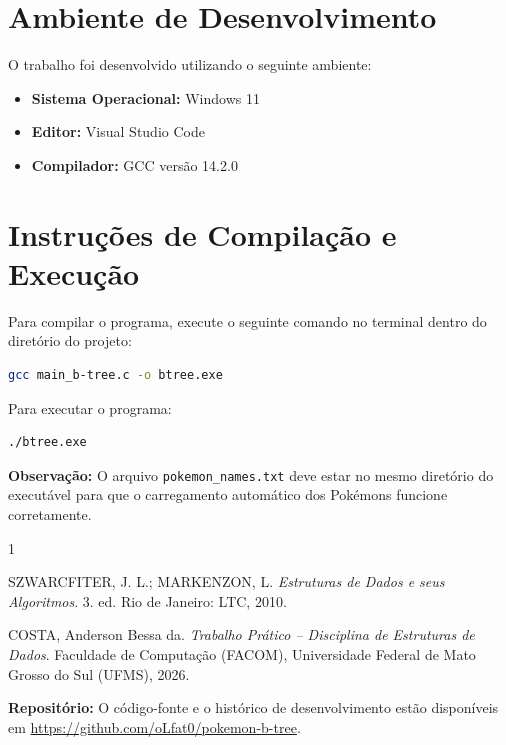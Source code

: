 \documentclass[12pt,a4paper]{article}
\begin{document}
\section{Ambiente de Desenvolvimento}

O trabalho foi desenvolvido utilizando o seguinte ambiente:

\begin{itemize}
    \item \textbf{Sistema Operacional:} Windows 11
    \item \textbf{Editor:} Visual Studio Code
    \item \textbf{Compilador:} GCC versão 14.2.0
\end{itemize}

\section{Instruções de Compilação e Execução}

Para compilar o programa, execute o seguinte comando no terminal dentro do diretório do projeto:

\begin{lstlisting}[language=bash, numbers=none]
gcc main_b-tree.c -o btree.exe
\end{lstlisting}

Para executar o programa:

\begin{lstlisting}[language=bash, numbers=none]
./btree.exe
\end{lstlisting}

\textbf{Observação:} O arquivo \texttt{pokemon\_names.txt} deve estar no mesmo diretório do executável para que o carregamento automático dos Pokémons funcione corretamente.

\begin{thebibliography}{1}

SZWARCFITER, J. L.; MARKENZON, L.
\textit{Estruturas de Dados e seus Algoritmos}.
3. ed. Rio de Janeiro: LTC, 2010.

COSTA, Anderson Bessa da.
\textit{Trabalho Prático -- Disciplina de Estruturas de Dados}.
Faculdade de Computação (FACOM), Universidade Federal de Mato Grosso do Sul (UFMS), 2026.

\end{thebibliography}

\textbf{Repositório:} O código-fonte e o histórico de desenvolvimento
estão disponíveis em \url{https://github.com/oLfat0/pokemon-b-tree}.
\end{document}
